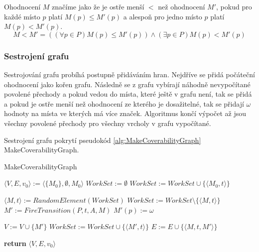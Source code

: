 \documentclass[
  biblatex,
  glossaries,
  printversion
]{kidiplom}
\begin{document}
Ohodnocení $M$ značíme jako že je ostře menší $<$ než ohodnocení $M'$,
pokud pro každé místo $p$ platí $M(p) \leq M'(p)$ a alespoň pro jedno
místo $p$ platí $M(p) < M'(p)$.
$$
 M<M' = ((\forall p \in P) M(p) \leq M'(p)) \land (\exists p \in P) M(p) < M'(p)
$$

\subsubsection{Sestrojení grafu}

Sestrojování grafu probíhá postupně přidáváním hran. Nejdříve se přidá počáteční 
ohodnocení jako kořen grafu. Následně se z grafu vybírají náhodně
nevypočítané povolené přechody a pokud vedou do místa, které ještě 
v grafu není, tak se přidá a pokud je ostře menší než ohodnocení ze kterého
je dosažitelné, tak se přidají $\omega$ hodnoty na místa ve kterých má více značek.
Algoritmus končí výpočet až jsou všechny povolené 
přechody pro všechny vrcholy v grafu vypočítané.

\begin{center}
  Sestrojení grafu pokrytí pseudokód \ref{alg:MakeCoverabilityGraph} MakeCoverabilityGraph.
\end{center}

\begin{algorithm}
  \caption{MakeCoverabilityGraph}\label{alg:MakeCoverabilityGraph}
  \begin{algorithmic}[1]
    \State $\langle V,E,v_0\rangle := \langle\{M_0\},\emptyset,M_0\rangle$
    \State $WorkSet := \emptyset $
    \State $WorkSet := WorkSet \cup \{\langle M_0, t \rangle\} $
    \EndFor

    \State $\langle M, t \rangle := RandomElement(WorkSet)$
    \State $WorkSet := WorkSet \setminus \{\langle M, t \rangle\}$
    \State $M' := FireTransition(P,t,A,M)$
    \State $M'(p) := \omega$
    \EndIf
    \EndFor
    \EndFor

    \State $V := V \cup \{M'\}$
    \State $WorkSet := WorkSet \cup \{\langle M', t \rangle\} $
    \EndFor
    \EndIf
    \State $E := E \cup \{\langle M,t,M'\rangle\}$
    \EndWhile

    \State \textbf{return} $\langle V,E,v_0\rangle$
    \EndFunction
  \end{algorithmic}
\end{algorithm}
\end{document}
